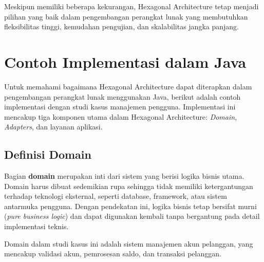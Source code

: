 Meskipun memiliki beberapa kekurangan, Hexagonal Architecture tetap menjadi pilihan yang baik dalam pengembangan perangkat lunak yang membutuhkan fleksibilitas tinggi, kemudahan pengujian, dan skalabilitas jangka panjang.



\section{Contoh Implementasi dalam Java}

Untuk memahami bagaimana Hexagonal Architecture dapat diterapkan dalam pengembangan perangkat lunak menggunakan Java, berikut adalah contoh implementasi dengan studi kasus manajemen pengguna. Implementasi ini mencakup tiga komponen utama dalam Hexagonal Architecture: \textit{Domain}, \textit{Adapters}, dan layanan aplikasi.



\subsection{Definisi Domain}

Bagian \textbf{domain} merupakan inti dari sistem yang berisi logika bisnis utama. Domain harus dibuat sedemikian rupa sehingga tidak memiliki ketergantungan terhadap teknologi eksternal, seperti database, framework, atau sistem antarmuka pengguna. Dengan pendekatan ini, logika bisnis tetap bersifat murni (\textit{pure business logic}) dan dapat digunakan kembali tanpa bergantung pada detail implementasi teknis.

Domain dalam studi kasus ini adalah sistem manajemen akun pelanggan, yang mencakup validasi akun, pemrosesan saldo, dan transaksi pelanggan.

